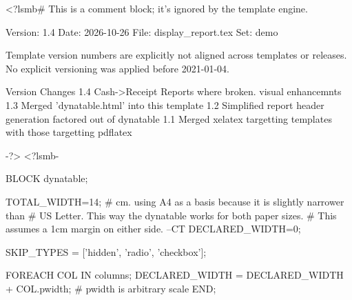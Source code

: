 <?lsmb#   This is a comment block; it's ignored by the template engine.

   Version:  1.4
   Date:     2026-10-26
   File:     display_report.tex
   Set:      demo

Template version numbers are explicitly not aligned across templates or
releases. No explicit versioning was applied before 2021-01-04.

Version   Changes
1.4       Cash->Receipt Reports where broken. visual enhancemnts
1.3       Merged 'dynatable.html' into this template
1.2       Simplified report header generation factored out of dynatable
1.1       Merged xelatex targetting templates with those targetting pdflatex


-?>
<?lsmb-

BLOCK dynatable;

    TOTAL_WIDTH=14; # cm. using A4 as a basis because it is slightly narrower than
                    # US Letter. This way the dynatable works for both paper sizes.
                    # This assumes a 1cm margin on either side. --CT
    DECLARED_WIDTH=0;

    SKIP_TYPES = ['hidden', 'radio', 'checkbox'];


    FOREACH COL IN columns;
        DECLARED_WIDTH = DECLARED_WIDTH + COL.pwidth; # pwidth is arbitrary scale
    END;


